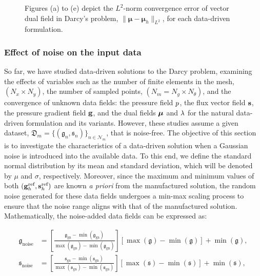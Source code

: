 \begin{figure}[h!]
	\centering
	\caption{Figures (a) to (e) depict the $ L^{2}$-norm convergence error of vector dual field in Darcy's problem, $ \|\boldsymbol{\mu}-\boldsymbol{\mu}_h\|_{L^{2}} $, for each data-driven formulation.}
	\def\svgwidth{\columnwidth}  
	  
	\label{fig:DNLSP1_conv_mu_L2}  
\end{figure}




\clearpage
\subsubsection{Effect of noise on the input data}

So far, we have studied data-driven solutions to the Darcy problem, examining the effects of variables such as the number of finite elements in the mesh, $ (N_{x} \times N_{y}) $, the number of sampled points, $ (N_{m} = N_{g} \times N_{\theta}) $, and the convergence of unknown data fields: the pressure field $ p $, the flux vector field $ \mathbf{s} $, the pressure gradient field $ \mathbf{g} $, and the dual fields $ \boldsymbol{\mu} $ and $ \lambda $ for the natural data-driven formulation and its variants. However, these studies assume a given dataset, $\mathfrak{D}_{m} = \{(\mathfrak{g}_{n}, \mathfrak{s}_{n})\}_{n \in \mathcal{N}_{m}}$, that is noise-free. The objective of this section is to investigate the characteristics of a data-driven solution when a Gaussian noise is introduced into the available data. To this end, we define the standard normal distribution by its mean and standard deviation, which will be denoted by $ \mu $ and $ \sigma $, respectively. Moreover, since the maximum and minimum values of both $(\mathbf{g}_{h}^{\text{ref}}, \mathbf{s}_{h}^{\text{ref}})$ are known \textit{a priori} from the manufactured solution, the random noise generated for these data fields undergoes a min-max scaling process to ensure that the noise range aligns with that of the manufactured solution. Mathematically, the noise-added data fields can be expressed as:

\begin{equation}
	\begin{aligned}
		\mathfrak{g}_{\text{noise}} &= \left[\frac{\mathfrak{g}_{\text{gn}} - \min(\mathfrak{g}_{\text{gn}})}{\max(\mathfrak{g}_{\text{gn}}) - \min(\mathfrak{g}_{\text{gn}})} \right] \left[\max(\mathfrak{g}) - \min(\mathfrak{g})\right] + \min(\mathfrak{g}), \\
		\mathfrak{s}_{\text{noise}} &= \left[\frac{\mathfrak{s}_{\text{gn}} - \min(\mathfrak{s}_{\text{gn}})}{\max(\mathfrak{s}_{\text{gn}}) - \min(\mathfrak{s}_{\text{gn}})} \right] \left[\max(\mathfrak{s}) - \min(\mathfrak{s})\right] + \min(\mathfrak{s}),
	\end{aligned}
\end{equation}

